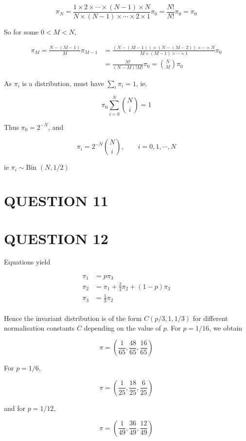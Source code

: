 \documentclass[a4paper]{article}
\begin{document}
\[ \pi_{N} = \frac{1 \times 2 \times \cdots \times (N-1) \times N}{N \times (N-1) \times \cdots \times 2 \times 1} \pi_{0} = \frac{N!}{N!} \pi_{0} = \pi_{0} \]

So for some $ 0 < M < N $,

\begin{align*}
\pi_{M} = \frac{N - (M - 1)}{M} \pi_{M-1} & = \frac{(N-(M-1)) \times (N - (M - 2)) \times \cdots \times  N  }{M \times (M-1) \times \cdots \times 1} \pi_{0} \\
& = \frac{N!}{(N-M)!M!} \pi_{0} = \binom{N}{M} \pi_{0}
\end{align*}

As $ \pi_{i} $ is a distribution, must have $ \sum_{i} \pi_{i} = 1 $, ie.

\[ \pi_{0} \sum_{i=0}^{N} \binom{N}{i} = 1   \]

Thus $ \pi_{0} = 2^{-N} $, and 

\[ \pi_{i} = 2^{-N} \binom{N}{i}, \qquad i = 0,1,\cdots,N \]

ie $ \pi_{i} \sim \text{Bin }(N, 1/2) $



\section{QUESTION 11}
\section{QUESTION 12}

Equations yield

\begin{align*}
\pi_{1} & = p \pi_{3} \\
\pi_{2} & = \pi_{1} + \frac{2}{3} \pi_{2} + (1-p) \pi_{3} \\
\pi_{3} & = \frac{1}{3} \pi_{2} \\ 
\end{align*}

Hence the invariant distribution is of the form $ C(p/3,1,1/3) $ for different normalisation constants $ C $ depending on the value of $ p $. For $ p = 1/16 $, we obtain

\[ \pi = \left( \frac{1}{65}, \frac{48}{65}, \frac{16}{65} \right) \]

For $ p = 1/6 $,

\[ \pi = \left( \frac{1}{25}, \frac{18}{25}, \frac{6}{25} \right) \]

and for $ p = 1/12 $,

\[ \pi = \left( \frac{1}{49}, \frac{36}{49}, \frac{12}{49} \right) \]
\end{document}
